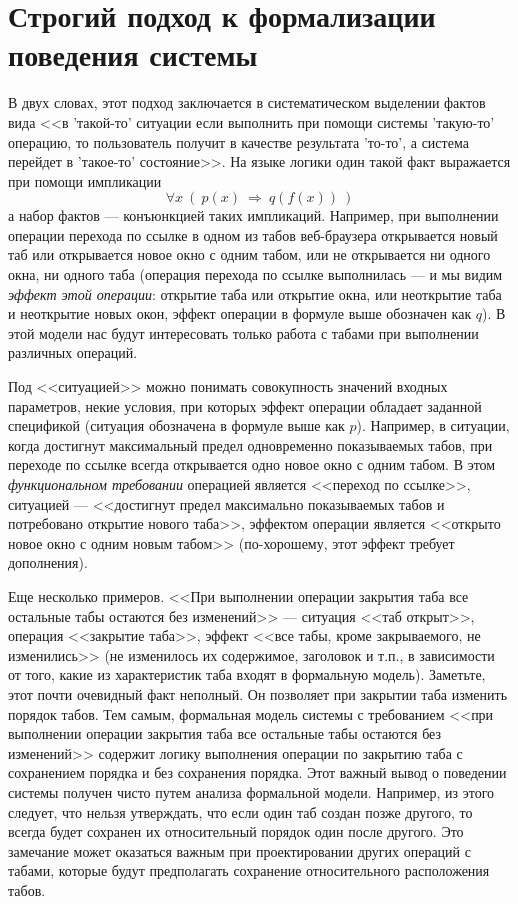 \documentclass[14pt, twoside]{extreport}
\begin{document}
\section{Строгий подход к формализации поведения системы}

В двух словах, этот подход заключается в систематическом выделении фактов вида <<в 'такой-то' ситуации если выполнить при помощи системы 'такую-то' операцию, то пользователь получит в качестве результата 'то-то', а система перейдет в 'такое-то' состояние>>. На языке логики один такой факт выражается при помощи импликации $$\forall x~ ( ~p(x)~ \Rightarrow ~q(f(x)) ~)$$ а набор фактов --- конъюнкцией таких импликаций. Например, при выполнении операции перехода по ссылке в одном из табов веб-браузера открывается новый таб или открывается новое окно с одним табом, или не открывается ни одного окна, ни одного таба (операция перехода по ссылке выполнилась --- и мы видим \emph{эффект этой операции}: открытие таба или открытие окна, или неоткрытие таба и неоткрытие новых окон, эффект операции в формуле выше обозначен как $q$). В этой модели нас будут интересовать только работа с табами при выполнении различных операций.

Под <<ситуацией>> можно понимать совокупность значений входных параметров, некие условия, при которых эффект операции обладает заданной спецификой (ситуация обозначена в формуле выше как $p$). Например, в ситуации, когда достигнут максимальный предел одновременно показываемых табов, при переходе по ссылке всегда открывается одно новое окно с одним табом. В этом \emph{функциональном требовании} операцией является <<переход по ссылке>>, ситуацией --- <<достигнут предел максимально показываемых табов и потребовано открытие нового таба>>, эффектом операции является <<открыто новое окно с одним новым табом>> (по-хорошему, этот эффект требует дополнения).

Еще несколько примеров. <<При выполнении операции закрытия таба все остальные табы остаются без изменений>> --- ситуация <<таб открыт>>, операция <<закрытие таба>>, эффект <<все табы, кроме закрываемого, не изменились>> (не изменилось их содержимое, заголовок и т.п., в зависимости от того, какие из характеристик таба входят в формальную модель). Заметьте, этот почти очевидный факт неполный. Он позволяет при закрытии таба изменить порядок табов. Тем самым, формальная модель системы с требованием <<при выполнении операции закрытия таба все остальные табы остаются без изменений>> содержит логику выполнения операции по закрытию таба с сохранением порядка и без сохранения порядка. Этот важный вывод о поведении системы получен чисто путем анализа формальной модели. Например, из этого следует, что нельзя утверждать, что если один таб создан позже другого, то всегда будет сохранен их относительный порядок один после другого. Это замечание может оказаться важным при проектировании других операций с табами, которые будут предполагать сохранение относительного расположения табов.
\end{document}
